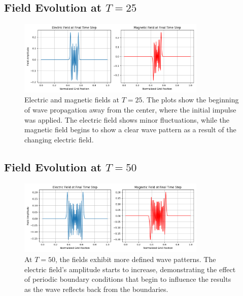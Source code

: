 \documentclass{article}[a4paper]
\begin{document}
\subsection{Field Evolution at \( T = 25 \)}
\begin{figure}[H]
    \centering
    \includegraphics[width=0.8\textwidth]{materials/Figure_25.png}
    \caption{Electric and magnetic fields at \( T = 25 \). The plots show the beginning of wave propagation away from the center, where the initial impulse was applied. The electric field shows minor fluctuations, while the magnetic field begins to show a clear wave pattern as a result of the changing electric field.}
\end{figure}

\subsection{Field Evolution at \( T = 50 \)}
\begin{figure}[H]
    \centering
    \includegraphics[width=0.8\textwidth]{materials/Figure_50.png}
    \caption{At \( T = 50 \), the fields exhibit more defined wave patterns. The electric field's amplitude starts to increase, demonstrating the effect of periodic boundary conditions that begin to influence the results as the wave reflects back from the boundaries.}
\end{figure}
\end{document}
